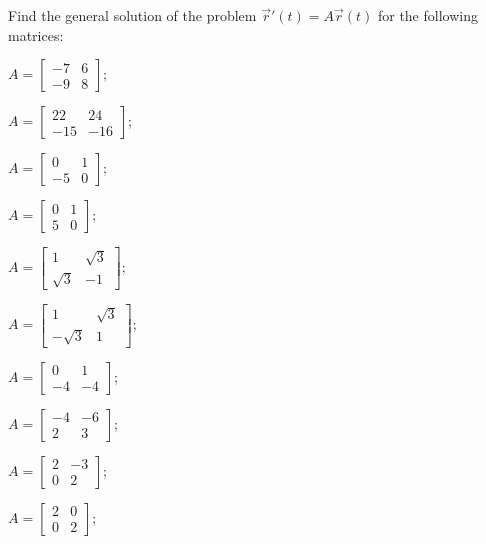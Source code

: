 \begin{exercises}

	\begin{problist}
	\prob \label{mod17-gensol}Find the general solution of the problem $\vec{r}'(t) = A \vec{r}(t)$ for the following matrices:
	\begin{enumerate}
	\begin{minipage}{.2\textwidth}
		\item $A = \begin{bmatrix} -7 & 6 \\ -9 & 8 \end{bmatrix}$;
		\item $A = \begin{bmatrix} 22 & 24 \\ -15 & -16\end{bmatrix}$;
		\item $A = \begin{bmatrix} 0 & 1 \\ -5 & 0 \end{bmatrix}$;
		\item $A = \begin{bmatrix} 0 & 1 \\ 5 & 0 \end{bmatrix}$;
		\item $A = \begin{bmatrix} 1 & \sqrt{3} \\ \sqrt{3} & -1\end{bmatrix}$;
		\item $A = \begin{bmatrix} 1 & \sqrt{3} \\ -\sqrt{3} & 1\end{bmatrix}$;
	\end{minipage}
	\qquad
	\begin{minipage}{.2\textwidth}
		\item $A = \begin{bmatrix} 0 & 1 \\ -4 & -4 \end{bmatrix}$;
		\item $A = \begin{bmatrix} -4 & -6 \\ 2 & 3 \end{bmatrix}$;
		\item $A = \begin{bmatrix} 2 & -3 \\ 0 & 2 \end{bmatrix}$;
		\item $A = \begin{bmatrix} 2 & 0 \\ 0 & 2 \end{bmatrix}$;

\end{minipage}
\end{enumerate}
\end{problist}
\end{exercises}
